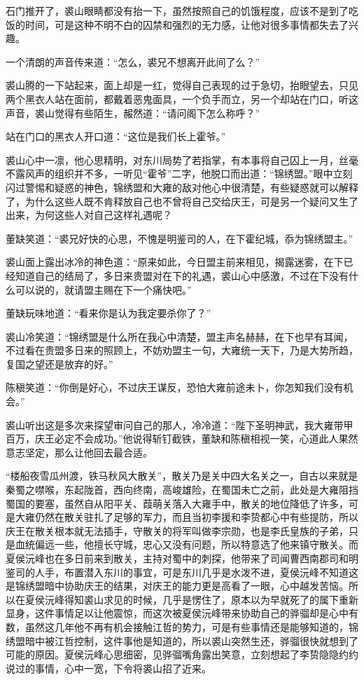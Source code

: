 石门推开了，裘山眼睛都没有抬一下，虽然按照自己的饥饿程度，应该不是到了吃饭的时间，可是这种不明不白的囚禁和强烈的无力感，让他对很多事情都失去了兴趣。

一个清朗的声音传来道：“怎么，裘兄不想离开此间了么？”

裘山腾的一下站起来，面上却是一红，觉得自己表现的过于急切，抬眼望去，只见两个黑衣人站在面前，都戴着恶鬼面具，一个负手而立，另一个却站在门口，听这声音，裘山觉得有些陌生，赧然道：“请问阁下怎么称呼？”

站在门口的黑衣人开口道：“这位是我们长上霍爷。”

裘山心中一凛，他心思精明，对东川局势了若指掌，有本事将自己囚上一月，丝毫不露风声的组织并不多，一听见“霍爷”二字，他脱口而出道：“锦绣盟。”眼中立刻闪过警惕和疑惑的神色，锦绣盟和大雍的敌对他心中很清楚，有些疑惑就可以解释了，为什么这些人既不肯释放自己也不曾将自己交给庆王，可是另一个疑问又生了出来，为何这些人对自己这样礼遇呢？

董缺笑道：“裘兄好快的心思，不愧是明鉴司的人，在下霍纪城，忝为锦绣盟主。”

裘山面上露出冰冷的神色道：“原来如此，今日盟主前来相见，揭露迷雾，在下已经知道自己的结局了，多日来贵盟对在下的礼遇，裘山心中感激，不过在下没有什么可以说的，就请盟主赐在下一个痛快吧。”

董缺玩味地道：“看来你是认为我定要杀你了？”

裘山冷笑道：“锦绣盟是什么所在我心中清楚，盟主声名赫赫，在下也早有耳闻，不过看在贵盟多日来的照顾上，不妨劝盟主一句，大雍统一天下，乃是大势所趋，复国之望还是放弃的好。”

陈稹笑道：“你倒是好心，不过庆王谋反，恐怕大雍前途未卜，你怎知我们没有机会。”

裘山听出这是多次来探望审问自己的那人，冷冷道：“陛下圣明神武，我大雍带甲百万，庆王必定不会成功。”他说得斩钉截铁，董缺和陈稹相视一笑，心道此人果然意志坚定，那么让他回去最合适。

“楼船夜雪瓜州渡，铁马秋风大散关”，散关乃是关中四大名关之一，自古以来就是秦蜀之噤喉，东起陇首，西向终南，高峻雄险，在蜀国未亡之前，此处是大雍阻挡蜀国的要塞，虽然自从阳平关、葭萌关落入大雍手中，散关的地位降低了许多，可是大雍仍然在散关驻扎了足够的军力，而且当初李援和李贽都心中有些提防，所以庆王在散关根本就无法插手，守散关的将军叫做李宗勋，也是李氏皇族的子弟，只是血统偏远一些，他擅长守城，忠心又没有问题，所以特意选了他来镇守散关。而夏侯沅峰也在多日前来到散关，主持对蜀中的刺探，他带来了司闻曹西南郡司和明鉴司的人手，布置潜入东川的事宜，可是东川几乎是水泼不进，夏侯沅峰不知道这是锦绣盟暗中协助庆王的结果，对庆王的能力更是高看了一眼，心中越发苦恼。所以在夏侯沅峰得知裘山求见的时候，几乎是愣住了，原本以为早就死了的属下重新显身，这件事情足以让他震惊，而这次被夏侯沅峰带来协助自己的骅骝却是心中有数，虽然这几年他不再有机会接触江哲的势力，可是有些事情还是能够知道的，锦绣盟暗中被江哲控制，这件事他是知道的，所以裘山突然生还，骅骝很快就想到了可能的原因。夏侯沅峰心思细密，见骅骝嘴角露出笑意，立刻想起了李贽隐隐约约说过的事情，心中一宽，下令将裘山招了近来。

